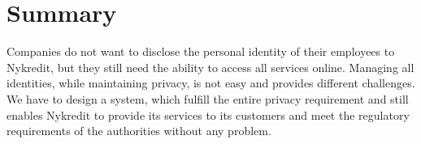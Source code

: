\section{Summary}
Companies do not want to disclose the personal identity of their employees to Nykredit, but they still need the ability to access all services online. Managing all identities, while maintaining privacy, is not easy and provides different challenges. We have to design a system, which fulfill the entire privacy requirement and still enables Nykredit to provide its services to its customers and meet the regulatory requirements of the authorities without any problem.
 